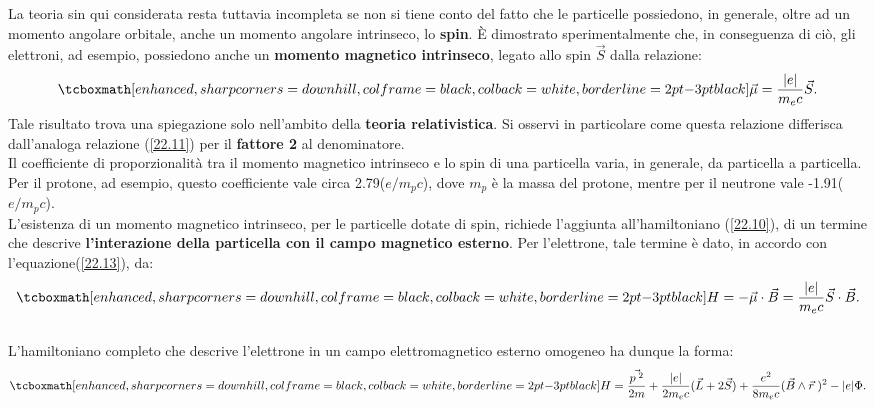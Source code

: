 \documentclass[a4paper,12pt,oneside]{book}
\begin{document}
La teoria sin qui considerata resta tuttavia incompleta se non si tiene conto del fatto che le particelle possiedono, in generale, oltre ad un momento angolare orbitale, anche un momento angolare intrinseco, lo \textbf{spin}. È dimostrato sperimentalmente che, in conseguenza di ciò, gli elettroni, ad esempio, possiedono anche un \textbf{momento magnetico intrinseco}, legato allo spin $\vec{S}$ dalla relazione:
	\begin{equation}
		\tcboxmath[enhanced, sharp corners=downhill, colframe=black, colback=white, borderline={2pt}{-3pt}{black}]{
			\vec{\mu}=\frac{|e|}{m_{e}c}\vec{S} .
			}
	\label{22.13}
	\end{equation}
Tale risultato trova una spiegazione solo nell'ambito della \textbf{teoria relativistica}. Si osservi in particolare come questa relazione differisca dall'analoga relazione (\ref{22.11}) per il \textbf{fattore 2} al denominatore.\\

Il coefficiente di proporzionalità tra il momento magnetico intrinseco e lo spin di una particella varia, in generale, da particella a particella. Per il protone, ad esempio, questo coefficiente vale circa 2.79($e/m_{p}c$), dove $m_{p}$ è la massa del protone, mentre per il neutrone vale -1.91($e/m_{p}c$).\\

L'esistenza di un momento magnetico intrinseco, per le particelle dotate di spin, richiede l'aggiunta all'hamiltoniano (\ref{22.10}), di un termine che descrive \textbf{l'interazione della particella con il campo magnetico esterno}. Per l'elettrone, tale termine è dato, in accordo con l'equazione(\ref{22.13}), da:
	\begin{equation}
		\tcboxmath[enhanced, sharp corners=downhill, colframe=black, colback=white, borderline={2pt}{-3pt}{black}]{
			H=-\vec{\mu}\cdot\vec{B}=\frac{|e|}{m_{e}c}\vec{S}\cdot\vec{B} .
			}
	\end{equation}\\
	
L'hamiltoniano completo che descrive l'elettrone in un campo elettromagnetico esterno omogeneo ha dunque la forma:
	\begin{equation}
		\tcboxmath[enhanced, sharp corners=downhill, colframe=black, colback=white, borderline={2pt}{-3pt}{black}]{
			H=\frac{\vec{p^{\;2}}}{2m}+\frac{|e|}{2m_{e}c}(\vec{L}+2\vec{S})+\frac{e^{2}}{8m_{e}c}(\vec{B}\wedge\vec{r}\;)^{2}-|e|\Phi .
			}
	\end{equation}
\end{document}
